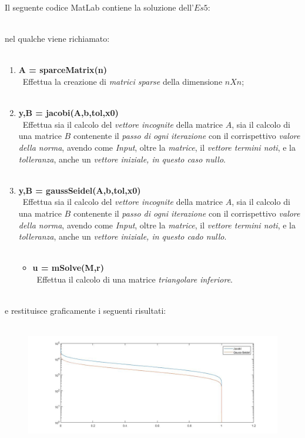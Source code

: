 Il seguente codice MatLab contiene la soluzione dell'$Es 5$:\\\
	
nel qualche viene richiamato:\\\
	\begin{enumerate}
		\item \textbf{A = sparceMatrix(n)}\\\
			Effettua la creazione di \textit{matrici sparse} della dimensione $nXn$;\\\
		\item \textbf{y,B = jacobi(A,b,tol,x0)}\\\
			Effettua sia il calcolo del \textit{vettore incognite} della matrice $A$, sia il calcolo di una matrice $B$ contenente il \textit{passo di ogni iterazione} con il corrispettivo \textit{valore della norma}, avendo come \textit{Input}, oltre la \textit{matrice}, il \textit{vettore termini noti}, e la \textit{tolleranza}, anche un \textit{vettore iniziale, in questo caso nullo}.\\\
		\item \textbf{y,B = gaussSeidel(A,b,tol,x0)}\\\
			Effettua sia il calcolo del \textit{vettore incognite} della matrice $A$, sia il calcolo di una matrice $B$ contenente il \textit{passo di ogni iterazione} con il corrispettivo \textit{valore della norma}, avendo come \textit{Input}, oltre la 	\textit{matrice}, il \textit{vettore termini noti}, e la \textit{tolleranza}, anche un \textit{vettore iniziale, in questo cado nullo}.\\\
		\begin{itemize}
			\item \textbf{u = mSolve(M,r)}\\\
				Effettua il calcolo di una matrice \textit{triangolare inferiore}.\\\
		\end{itemize}
	\end{enumerate}
e restituisce graficamente i seguenti risultati:\\\
	\begin{figure}[H]
		\includegraphics[width=\textwidth]{Plot/Cap_6_Es_5}
	\end{figure}